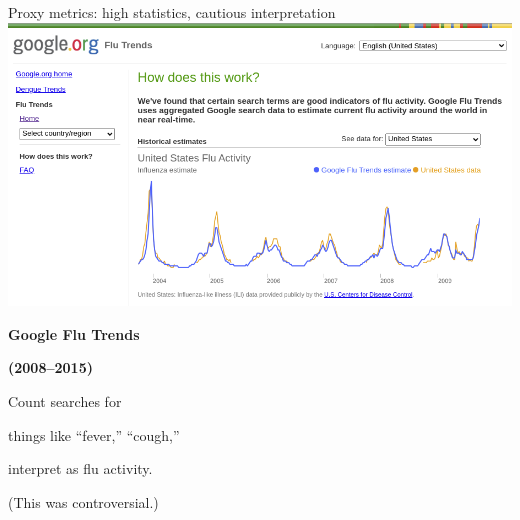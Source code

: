 \documentclass[aspectratio=169]{beamer}
\begin{document}
\begin{frame}{Proxy metrics: high statistics, cautious interpretation}
\vspace{0.25 cm}
\mbox{\hspace{0.75 cm}\includegraphics[width=\linewidth]{google-flu-trends.png}}

\vspace{-3.35 cm}
\hspace{-0.25 cm}\begin{minipage}{0.3\linewidth}
{\bf Google Flu Trends}

{\bf (2008--2015)}

\small
\vspace{0.25 cm}
Count searches for

things like ``fever,'' ``cough,''

interpret as flu activity.

\vspace{0.25 cm}
(This was controversial.)
\end{minipage}
\vspace{3.35 cm}
\end{frame}

\begin{frame}{}




\end{frame}
\end{document}
